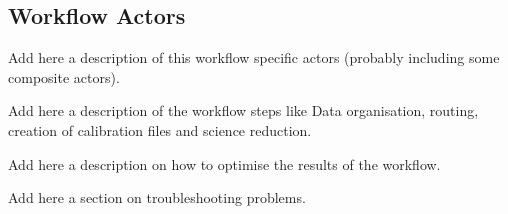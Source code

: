 \documentclass[pdftex,a4paper,twoside,11pt]{article}
\begin{document}
\subsection{Workflow Actors}

Add here a description of this workflow specific actors 
(probably including some composite actors).


Add here a description of the workflow steps like Data organisation,
routing, creation of calibration files and science reduction.

Add here a description on how to optimise the results of the workflow.



Add here a section on troubleshooting problems.

%
\end{document}
